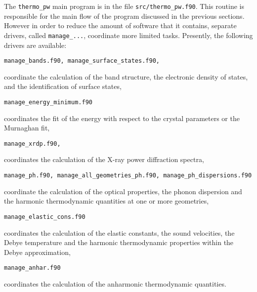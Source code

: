 \documentclass[12pt,a4paper]{article}
\begin{document}
The \texttt{thermo\_pw} main program is in the file \texttt{src/thermo\_pw.f90}.
This routine is responsible for the main flow of the program discussed
in the previous sections. However in order to reduce the amount of
software that it contains, separate drivers, called 
\texttt{manage\_...},  coordinate more limited tasks.
Presently, the following drivers are available:
\begin{verbatim}
manage_bands.f90, manage_surface_states.f90,      
\end{verbatim}
coordinate the calculation of the band structure, the electronic density
of states, and the identification of surface states,
\begin{verbatim}
manage_energy_minimum.f90      
\end{verbatim}
coordinates the fit of the energy with respect to the crystal parameters
or the Murnaghan fit,
\begin{verbatim}
manage_xrdp.f90,                
\end{verbatim}
coordinates the calculation of the X-ray power diffraction spectra,
\begin{verbatim}
manage_ph.f90, manage_all_geometries_ph.f90, manage_ph_dispersions.f90      
\end{verbatim}
coordinate the calculation of the optical properties, the phonon dispersion
and the harmonic thermodynamic quantities at one or more geometries,
\begin{verbatim}
manage_elastic_cons.f90        
\end{verbatim}
coordinates the calculation of the elastic constants, the sound velocities,
the Debye temperature and the harmonic thermodynamic properties within the 
Debye approximation,
\begin{verbatim}
manage_anhar.f90               
\end{verbatim}
coordinates the calculation of the anharmonic thermodynamic quantities.

\newpage
\end{document}
